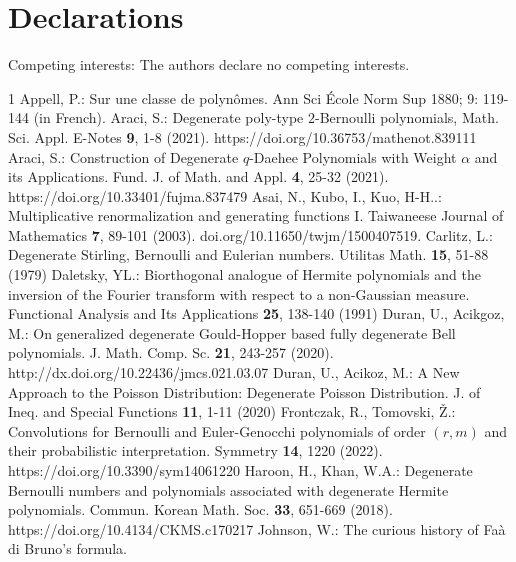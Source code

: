 \documentclass{birkjour}
\theoremstyle{definition}
\theoremstyle{remark}
\numberwithin{equation}{section}
\begin{document}
\section*{Declarations}
Competing interests: The authors declare no competing interests.
\begin{thebibliography}{1}
\bibitem{[a80]}
Appell, P.: Sur une classe de polyn\^{o}mes. Ann Sci \'{E}cole Norm
Sup 1880; 9: 119-144 (in French).
\bibitem{[a21]}
Araci, S.: Degenerate poly-type $2$-Bernoulli polynomials, Math.
Sci. Appl. E-Notes \textbf{9}, 1-8 (2021).
https://doi.org/10.36753/mathenot.839111
\bibitem{[a21b]}
Araci, S.: Construction of Degenerate $q$-Daehee Polynomials with
Weight $\alpha$ and its Applications. Fund. J. of Math. and Appl.
\textbf{4}, 25-32 (2021). https://doi.org/10.33401/fujma.837479
\bibitem{[acc03]}
Asai, N., Kubo, I., Kuo, H-H..: Multiplicative renormalization and
generating functions I. Taiwaneese Journal of Mathematics
\textbf{7}, 89-101 (2003). doi.org/10.11650/twjm/1500407519.
\bibitem{[c79]}
Carlitz, L.: Degenerate Stirling, Bernoulli and Eulerian numbers.
Utilitas Math. \textbf{15}, 51-88 (1979)
\bibitem{[d91]}
Daletsky, YL.: Biorthogonal analogue of Hermite polynomials and the
inversion of the Fourier transform with respect to a non-Gaussian
measure. Functional Analysis and Its Applications \textbf{25},
138-140 (1991)
%
\bibitem{[da20]}
Duran, U., Acikgoz, M.: On generalized degenerate Gould-Hopper based
fully degenerate Bell polynomials. J. Math. Comp. Sc. \textbf{21},
243-257 (2020). http://dx.doi.org/10.22436/jmcs.021.03.07
\bibitem{[da20b]}
Duran, U., Acikoz, M.: A New Approach to the Poisson Distribution:
Degenerate Poisson Distribution. J. of Ineq. and Special Functions
\textbf{11}, 1-11  (2020)
\bibitem{[ft22]}
Frontczak, R., Tomovski, \v{Z}.: Convolutions for Bernoulli and
Euler-Genocchi polynomials of order $(r, m)$ and their probabilistic
interpretation. Symmetry \textbf{14}, 1220 (2022).
https://doi.org/10.3390/sym14061220
\bibitem{[hk18]}
Haroon, H., Khan, W.A.: Degenerate Bernoulli numbers and polynomials
associated with degenerate Hermite polynomials. Commun. Korean Math.
Soc. \textbf{33}, 651-669 (2018).
https://doi.org/10.4134/CKMS.c170217
\bibitem{[j02]}
Johnson, W.: The curious history of Fa\`{a} di Bruno's formula.

\end{thebibliography}
\end{document}
